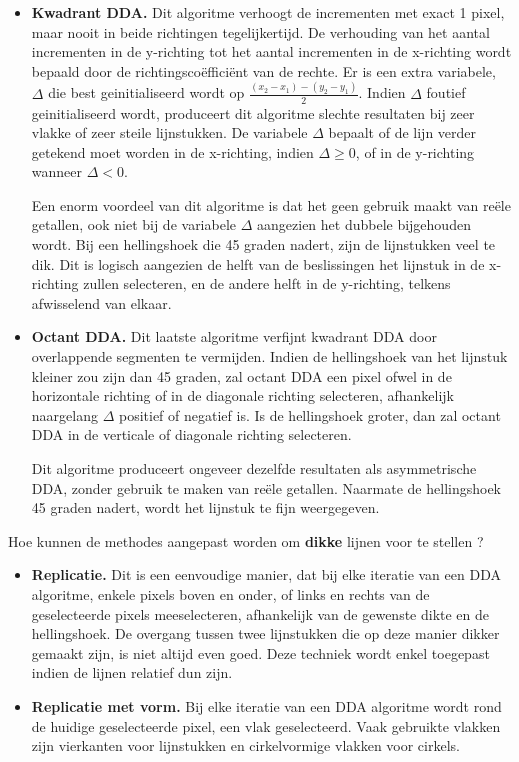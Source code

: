 \documentclass{report}
\begin{document}
\begin{enumerate}
{\begin{itemize}
			\item \textbf{Kwadrant DDA.} Dit algoritme verhoogt de incrementen met exact 1 pixel, maar nooit in beide richtingen tegelijkertijd. De verhouding van het aantal incrementen in de y-richting tot het aantal incrementen in de x-richting wordt bepaald door de richtingscoëfficiënt van de rechte. Er is een extra variabele, $\Delta$ die best geinitialiseerd wordt op $\frac{(x_2 - x_1) - (y_2 - y_1)}{2}$. Indien $\Delta$ foutief geinitialiseerd wordt, produceert dit algoritme slechte resultaten bij zeer vlakke of zeer steile lijnstukken. De variabele $\Delta$ bepaalt of de lijn verder getekend moet worden in de x-richting, indien $\Delta \geq 0$, of in de y-richting wanneer $\Delta < 0$.
			      				
			      Een enorm voordeel van dit algoritme is dat het geen gebruik maakt van reële getallen, ook niet bij de  variabele $\Delta$ aangezien het dubbele bijgehouden wordt. Bij een hellingshoek die 45 graden nadert, zijn de lijnstukken veel te dik. Dit is logisch aangezien de helft van de beslissingen het lijnstuk in de x-richting zullen selecteren, en de andere helft in de y-richting, telkens afwisselend van elkaar.
			      				
			\item \textbf{Octant DDA.} Dit laatste algoritme verfijnt kwadrant DDA door overlappende segmenten te vermijden. Indien de hellingshoek van het lijnstuk kleiner zou zijn dan 45 graden, zal octant DDA een pixel ofwel in de horizontale richting of in de diagonale richting selecteren, afhankelijk naargelang $\Delta$ positief of negatief is. Is de hellingshoek groter, dan zal octant DDA in de verticale of diagonale richting selecteren. 
			      				
			      Dit algoritme produceert ongeveer dezelfde resultaten als asymmetrische DDA, zonder gebruik te maken van reële getallen. Naarmate de hellingshoek 45 graden nadert, wordt het lijnstuk te fijn weergegeven.
		\end{itemize}
	}
		
			
	\vraag
	{
		Hoe kunnen de methodes aangepast worden om \textbf{dikke} lijnen voor te stellen ? 
	}
	{
		\begin{itemize}
			\item \textbf{Replicatie.} Dit is een eenvoudige manier, dat bij elke iteratie van een DDA algoritme, enkele pixels boven en onder, of links en rechts van de geselecteerde pixels meeselecteren, afhankelijk van de gewenste dikte en de hellingshoek. De overgang tussen twee lijnstukken die op deze manier dikker gemaakt zijn, is niet altijd even goed. Deze techniek wordt enkel toegepast indien de lijnen relatief dun zijn.
			\item \textbf{Replicatie met vorm.} Bij elke iteratie van een DDA algoritme wordt rond de huidige geselecteerde pixel, een vlak geselecteerd. Vaak gebruikte vlakken zijn vierkanten voor lijnstukken en cirkelvormige vlakken voor cirkels.
			      				

\end{itemize}}
\end{enumerate}
\end{document}
